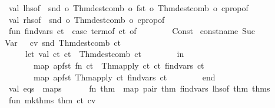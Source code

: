 \begin{isabellebody}
\ \ \ \ val\ lhs{\isacharunderscore}of\ {\isacharequal}\ snd\ o\ Thm{\isachardot}dest{\isacharunderscore}comb\ o\ fst\ o\ Thm{\isachardot}dest{\isacharunderscore}comb\ o\ cprop{\isacharunderscore}of{\isacharsemicolon}\isanewline
\ \ \ \ val\ rhs{\isacharunderscore}of\ {\isacharequal}\ snd\ o\ Thm{\isachardot}dest{\isacharunderscore}comb\ o\ cprop{\isacharunderscore}of{\isacharsemicolon}\isanewline
\ \ \ \ fun\ find{\isacharunderscore}vars\ ct\ {\isacharequal}\ {\isacharparenleft}case\ term{\isacharunderscore}of\ ct\ of\isanewline
\ \ \ \ \ \ \ \ {\isacharparenleft}Const\ {\isacharparenleft}%
\isaantiq
const{\isacharunderscore}name\ Suc{}%
\endisaantiq
{\isacharcomma}\ {\isacharunderscore}{\isacharparenright}\ {\isachardollar}\ Var\ {\isacharunderscore}{\isacharparenright}\ {\isacharequal}{\isachargreater}\ {\isacharbrackleft}{\isacharparenleft}cv{\isacharcomma}\ snd\ {\isacharparenleft}Thm{\isachardot}dest{\isacharunderscore}comb\ ct{\isacharparenright}{\isacharparenright}{\isacharbrackright}\isanewline
\ \ \ \ \ \ {\isacharbar}\ {\isacharunderscore}\ {\isachardollar}\ {\isacharunderscore}\ {\isacharequal}{\isachargreater}\isanewline
\ \ \ \ \ \ \ \ let\ val\ {\isacharparenleft}ct{}{\isacharcomma}\ ct{}{\isacharparenright}\ {\isacharequal}\ Thm{\isachardot}dest{\isacharunderscore}comb\ ct\isanewline
\ \ \ \ \ \ \ \ in\ \isanewline
\ \ \ \ \ \ \ \ \ \ map\ {\isacharparenleft}apfst\ {\isacharparenleft}fn\ ct\ {\isacharequal}{\isachargreater}\ Thm{\isachardot}apply\ ct\ ct{}{\isacharparenright}{\isacharparenright}\ {\isacharparenleft}find{\isacharunderscore}vars\ ct{}{\isacharparenright}\ {\isacharat}\isanewline
\ \ \ \ \ \ \ \ \ \ map\ {\isacharparenleft}apfst\ {\isacharparenleft}Thm{\isachardot}apply\ ct{}{\isacharparenright}{\isacharparenright}\ {\isacharparenleft}find{\isacharunderscore}vars\ ct{}{\isacharparenright}\isanewline
\ \ \ \ \ \ \ \ end\isanewline
\ \ \ \ \ \ {\isacharbar}\ {\isacharunderscore}\ {\isacharequal}{\isachargreater}\ {\isacharbrackleft}{\isacharbrackright}{\isacharparenright}{\isacharsemicolon}\isanewline
\ \ \ \ val\ eqs\ {\isacharequal}\ maps\isanewline
\ \ \ \ \ \ {\isacharparenleft}fn\ thm\ {\isacharequal}{\isachargreater}\ map\ {\isacharparenleft}pair\ thm{\isacharparenright}\ {\isacharparenleft}find{\isacharunderscore}vars\ {\isacharparenleft}lhs{\isacharunderscore}of\ thm{\isacharparenright}{\isacharparenright}{\isacharparenright}\ thms{\isacharsemicolon}\isanewline
\ \ \ \ fun\ mk{\isacharunderscore}thms\ {\isacharparenleft}thm{\isacharcomma}\ {\isacharparenleft}ct{\isacharcomma}\ cv{\isacharprime}{\isacharparenright}{\isacharparenright}\ {\isacharequal}\isanewline

\end{isabellebody}

